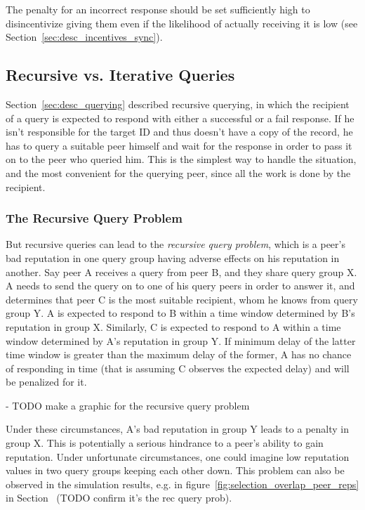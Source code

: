The penalty for an incorrect response should be set sufficiently high to
disincentivize giving them even if the likelihood of actually receiving it is
low (see Section~\ref{sec:desc_incentives_sync}).

\subsection{Recursive vs. Iterative Queries}
\label{sec:desc_recursive_vs_iterative}
Section~\ref{sec:desc_querying} described recursive querying, in which the
recipient of a query is expected to respond with either a successful or a fail
response. If he isn't responsible for the target ID and thus doesn't have a copy
of the record, he has to query a suitable peer himself and wait for the response
in order to pass it on to the peer who queried him. This is the simplest way to
handle the situation, and the most convenient for the querying peer, since all
the work is done by the recipient.

\subsubsection{The Recursive Query Problem}
\label{sec:desc_rec_query_prob}
But recursive queries can lead to the \emph{recursive query problem}, which is a
peer's bad reputation in one query group having adverse effects on his
reputation in another. Say peer A receives a query from peer B, and they share
query group X. A needs to send the query on to one of his query peers in order
to answer it, and determines that peer C is the most suitable recipient, whom he
knows from query group Y. A is expected to respond to B within a time window
determined by B's reputation in group X. Similarly, C is expected to respond to
A within a time window determined by A's reputation in group Y. If minimum delay
of the latter time window is greater than the maximum delay of the former, A has
no chance of responding in time (that is assuming C observes the expected
delay) and will be penalized for it.

- TODO make a graphic for the recursive query problem

Under these circumstances, A's bad reputation in group Y leads to a penalty in
group X. This is potentially a serious hindrance to a peer's ability to gain
reputation. Under unfortunate circumstances, one could imagine low reputation
values in two query groups keeping each other down. This problem can also be
observed in the simulation results, e.g. in
figure~\ref{fig:selection_overlap_peer_reps} in
Section~\label{sec:rep_avail_selection_overlap} (TODO confirm it's the rec query
prob).


